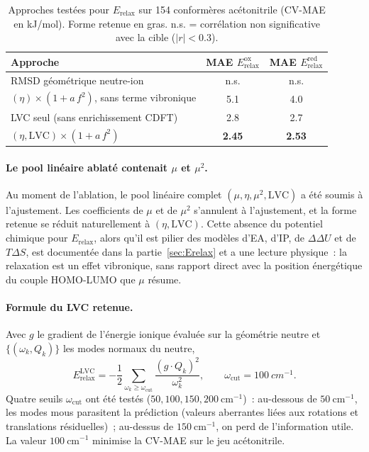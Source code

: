 \begin{table}[H]
\centering
\caption{Approches testées pour $E_\text{relax}$ sur 154 conformères acétonitrile (CV-MAE en kJ/mol). Forme retenue en gras. \og{}n.s.\fg{} = corrélation non significative avec la cible ($|r| < 0.3$).}
\label{tab:app_erelax_journey}
\footnotesize
\begin{tabular}{l c c}
\toprule
\textbf{Approche} & \textbf{MAE $E_\text{relax}^\text{ox}$} & \textbf{MAE $E_\text{relax}^\text{red}$} \\
\midrule
RMSD géométrique neutre-ion & n.s. & n.s. \\
$(\eta) \times (1 + a\, f^2)$, sans terme vibronique & 5.1 & 4.0 \\
LVC seul (sans enrichissement CDFT) & 2.8 & 2.7 \\
\textbf{$(\eta, \text{LVC}) \times (1 + a\, f^2)$} & \textbf{2.45} & \textbf{2.53} \\
\bottomrule
\end{tabular}
\end{table}

\paragraph{Le pool linéaire ablaté contenait $\mu$ et $\mu^2$.}
Au moment de l'ablation, le pool linéaire complet $(\mu, \eta, \mu^2, \text{LVC})$ a été soumis à l'ajustement. Les coefficients de $\mu$ et de $\mu^2$ s'annulent à l'ajustement, et la forme retenue se réduit naturellement à $(\eta, \text{LVC})$. Cette absence du potentiel chimique pour $E_\text{relax}$, alors qu'il est pilier des modèles d'EA, d'IP, de $\Delta\Delta U$ et de $T\Delta S$, est documentée dans la partie~\ref{sec:Erelax} et a une lecture physique~: la relaxation est un effet vibronique, sans rapport direct avec la position énergétique du couple HOMO-LUMO que $\mu$ résume.

\paragraph{Formule du LVC retenue.}
Avec $g$ le gradient de l'énergie ionique évaluée sur la géométrie neutre et $\{(\omega_k, Q_k)\}$ les modes normaux du neutre,
\begin{equation}
E_\text{relax}^\text{LVC} = -\frac{1}{2} \sum_{\omega_k \geq \omega_\text{cut}} \frac{(g \cdot Q_k)^2}{\omega_k^2}, \qquad \omega_\text{cut} = \SI{100}{cm^{-1}}.
\label{eq:app_lvc}
\end{equation}
Quatre seuils $\omega_\text{cut}$ ont été testés ($50, 100, 150, 200~\text{cm}^{-1}$)~: au-dessous de $50~\text{cm}^{-1}$, les modes mous parasitent la prédiction (valeurs aberrantes liées aux rotations et translations résiduelles)~; au-dessus de $150~\text{cm}^{-1}$, on perd de l'information utile. La valeur $100~\text{cm}^{-1}$ minimise la CV-MAE sur le jeu acétonitrile.

